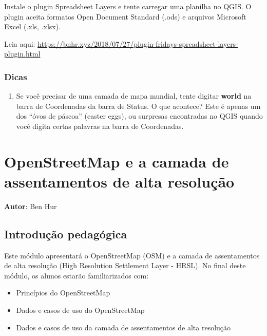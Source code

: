 \documentclass[
]{book}
\providecommand{\tightlist}{%
  \setlength{\itemsep}{0pt}\setlength{\parskip}{0pt}}
\begin{document}
Instale o plugin Spreadsheet Layers e tente carregar uma planilha no QGIS. O plugin aceita formatos Open Document Standard (.ods) e arquivos Microsoft Excel (.xls, .xlsx).

Leia aqui: \href{https://bnhr.xyz/2018/07/27/plugin-fridays-spreadsheet\%20-layers-plugin.html}{https://bnhr.xyz/2018/07/27/plugin-fridays-spreadsheet-layers-plugin.html}

\hypertarget{dicas-2}{%
\subsection{Dicas}\label{dicas-2}}

\begin{enumerate}
\def\labelenumi{\arabic{enumi}.}
\tightlist
\item
  Se você precisar de uma camada de mapa mundial, tente digitar \textbf{world} na barra de Coordenadas da barra de Status. O que acontece? Este é apenas um dos ``óvos de páscoa'' (easter eggs), ou surpresas encontradas no QGIS quando você digita certas palavras na barra de Coordenadas.
\end{enumerate}

\hypertarget{openstreetmap-e-a-camada-de-assentamentos-de-alta-resoluuxe7uxe3o}{%
\chapter{OpenStreetMap e a camada de assentamentos de alta resolução}\label{openstreetmap-e-a-camada-de-assentamentos-de-alta-resoluuxe7uxe3o}}

\textbf{Autor}: Ben Hur

\hypertarget{introduuxe7uxe3o-pedaguxf3gica-3}{%
\section{Introdução pedagógica}\label{introduuxe7uxe3o-pedaguxf3gica-3}}

Este módulo apresentará o OpenStreetMap (OSM) e a camada de assentamentos de alta resolução (High Resolution Settlement Layer - HRSL). No final deste módulo, os alunos estarão familiarizados com:

\begin{itemize}
\tightlist
\item
  Princípios do OpenStreetMap
\item
  Dados e casos de uso do OpenStreetMap
\item
  Dados e casos de uso da camada de assentamentos de alta resolução
\end{itemize}
\end{document}
